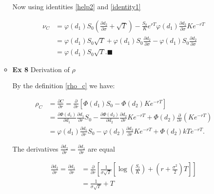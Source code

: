 \documentclass[12pt]{article}
\begin{document}
\begin{enumerate}[leftmargin=\labelsep]
\begin{itemize}
Now using identities \eqref{help2} and \eqref{identity1}

\begin{equation}
\begin{split}\label{vega_c1}
    \nu_C &= \varphi(d_1) S_0 \left( \frac{\partial d_2}{\partial \sigma} + \sqrt{T} \right)
    - \frac{S_0}{K} e^{rT} \varphi(d_1) \frac{\partial d_2}{\partial \sigma}
    Ke^{-rT}\\
    &= \varphi(d_1) S_0 \sqrt{T} 
    + \varphi(d_1) S_0 \frac{\partial d_2}{\partial \sigma}
    - \varphi(d_1) S_0 \frac{\partial d_2}{\partial \sigma} \\
    &= \varphi(d_1) S_0 \sqrt{T}. \blacksquare
\end{split}
\end{equation}

\item \textbf{Ex 8} Derivation of $\rho$

By the definition \eqref{rho_c} we have:

\begin{equation}
\begin{split}\label{rho_c1}
    \rho_C & = \frac{\partial C}{\partial r} = \frac{\partial }{\partial r} \left[ \Phi(d_1)S_0 - \Phi(d_2)Ke^{-rT} \right] \\
        &= \frac{\partial \Phi(d_1)}{\partial d_1}  \frac{\partial d_1}{\partial r} S_0 - 
        \frac{\partial \Phi(d_2)}{\partial d_2}  \frac{\partial d_2}{\partial r} Ke^{-rT}
        +\Phi(d_2) \frac{\partial }{\partial r} \left( K e^{-rT}\right)\\
        &= \varphi(d_1)  \frac{\partial d_1}{\partial r} S_0 - 
        \varphi(d_2)  \frac{\partial d_2}{\partial r} Ke^{-rT}
        + \Phi(d_2) kT e^{-rT}.
\end{split}
\end{equation}

The derivatives $\frac{\partial d_2}{\partial r} = \frac{\partial d_1}{\partial r}$ are equal

\begin{equation}
\begin{split}\label{derivatives}
    \frac{\partial d_2}{\partial r} = \frac{\partial d_1}{\partial r} &=
    \frac{\partial }{\partial r} \left[ \frac{1}{\sigma\sqrt{T}}\left[\log\left(\frac{S_t}{K}\right) + \left(r + \frac{\sigma^2}{2}\right)T\right] \right] \\
    &= \frac{1}{\sigma \sqrt{T}} + T
\end{split}
\end{equation}



\end{itemize}
\end{enumerate}
\end{document}
